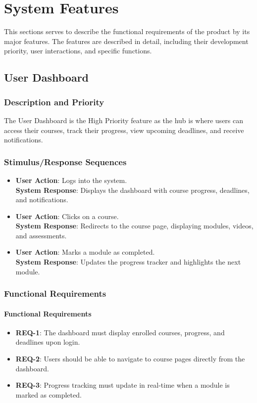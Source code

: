 \documentclass[a4paper, 11pt]{scrreprt}
\begin{document}
\chapter{System Features}
This sections serves to describe the functional requirements of the product by its major features. The features are described in detail, including their development priority, user interactions, and specific functions.

\section{User Dashboard}


\subsection{Description and Priority}
The User Dashboard is the High Priority feature as the hub is where users can access their courses, track their progress, view upcoming deadlines, and receive notifications.

\subsection{Stimulus/Response Sequences}
\begin{itemize}
    \item \textbf{User Action}: Logs into the system. \\
          \textbf{System Response}: Displays the dashboard with course progress, deadlines, and notifications.
    \item \textbf{User Action}: Clicks on a course. \\
          \textbf{System Response}: Redirects to the course page, displaying modules, videos, and assessments.
    \item \textbf{User Action}: Marks a module as completed. \\
          \textbf{System Response}: Updates the progress tracker and highlights the next module.
\end{itemize}

\subsection{Functional Requirements}
\subsubsection{Functional Requirements}
\begin{itemize}
    \item \textbf{REQ-1}: The dashboard must display enrolled courses, progress, and deadlines upon login.
    \item \textbf{REQ-2}: Users should be able to navigate to course pages directly from the dashboard.
    \item \textbf{REQ-3}: Progress tracking must update in real-time when a module is marked as completed.
\end{itemize}
\end{document}
